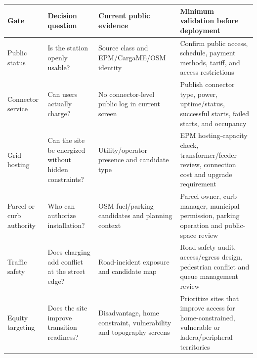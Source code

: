 \begin{tabular}{p{}p{}p{}p{}}
\toprule
Gate & Decision question & Current public evidence & Minimum validation before deployment \\
\midrule
Public status & Is the station openly usable? & Source class and EPM/CargaME/OSM identity & Confirm public access, schedule, payment methods, tariff, and access restrictions \\
Connector service & Can users actually charge? & No connector-level public log in current screen & Publish connector type, power, uptime/status, successful starts, failed starts, and occupancy \\
Grid hosting & Can the site be energized without hidden constraints? & Utility/operator presence and candidate type & EPM hosting-capacity check, transformer/feeder review, connection cost and upgrade requirement \\
Parcel or curb authority & Who can authorize installation? & OSM fuel/parking candidates and planning context & Parcel owner, curb manager, municipal permission, parking operation and public-space review \\
Traffic safety & Does charging add conflict at the street edge? & Road-incident exposure and candidate map & Road-safety audit, access/egress design, pedestrian conflict and queue management review \\
Equity targeting & Does the site improve transition readiness? & Disadvantage, home constraint, vulnerability and topography screens & Prioritize sites that improve access for home-constrained, vulnerable or ladera/peripheral territories \\
\bottomrule
\end{tabular}
